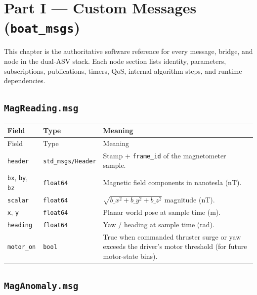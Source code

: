 \chapter{Part I --- Custom Messages (\texttt{boat\_msgs})}
\label{ch:ros-catalog}

This chapter is the authoritative software reference for every message, bridge, and node in the dual-ASV stack. Each node section lists identity, parameters, subscriptions, publications, timers, QoS, internal algorithm steps, and runtime dependencies.


\section{\texttt{MagReading.msg}}


\begin{center}
\small
\begin{longtable}{@{}llp{7.2cm}@{}}
\toprule
Field & Type & Meaning \\
\midrule
\endfirsthead
\toprule
Field & Type & Meaning \\
\midrule
\endhead
\texttt{header} & \texttt{std\_msgs/Header} & Stamp + \texttt{frame\_id} of the magnetometer sample. \\
\texttt{bx}, \texttt{by}, \texttt{bz} & \texttt{float64} & Magnetic field components in nanotesla (nT). \\
\texttt{scalar} & \texttt{float64} & \(\sqrt{b\_x^2+b\_y^2+b\_z^2}\) magnitude (nT). \\
\texttt{x}, \texttt{y} & \texttt{float64} & Planar world pose at sample time (m). \\
\texttt{heading} & \texttt{float64} & Yaw / heading at sample time (rad). \\
\texttt{motor\_on} & \texttt{bool} & True when commanded thruster surge or yaw exceeds the driver's motor threshold (for future motor-state bins). \\
\bottomrule
\end{longtable}
\end{center}


\section{\texttt{MagAnomaly.msg}}


